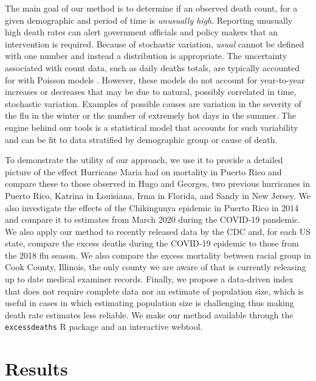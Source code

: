 \documentclass[11pt]{article}
\begin{document}
The main goal of our method is to determine if an observed death count, for a given demographic and period of time is \textit{unusually high}. Reporting unusually high death rates can alert government officials and policy makers that an intervention is required. Because of stochastic variation, \textit{usual} cannot be defined with one number and instead a distribution is appropriate. The uncertainty associated with count data, such as daily deaths totals, are typically accounted for with Poisson models \cite{mccullagh19831989, agresti2015foundations}. However, these models do not account for year-to-year increases or decreases that may be due to natural, possibly correlated in time, stochastic variation. Examples of possible causes are variation in the severity of the flu in the winter or the number of extremely hot days in the summer. The engine behind our tools is a statistical model that accounts for such variability and can be fit to data stratified by demographic group or cause of death. 

To demonstrate the utility of our approach, we use it to provide a detailed picture of the effect Hurricane Maria had on mortality in Puerto Rico and compare these to those observed in Hugo and Georges, two previous hurricanes in Puerto Rico, Katrina in Louisiana, Irma in Florida, and Sandy in New Jersey. We also investigate the effects of the Chikingunya epidemic in Puerto Rico in 2014 and compare it to estimates from March 2020 during the COVID-19 pandemic. We also apply our method to recently released data by the CDC and, for each US state, compare the excess deaths during the COVID-19 epidemic to those from the 2018 flu season. We also compare the excess mortality between racial group in Cook County, Illinois, the only county we are aware of that is currently releasing up to date medical examiner records. Finally, we propose a data-driven index that does not require complete data nor an estimate of population size, which is useful in cases in which estimating population size is challenging thus making death rate estimates less reliable. We make our method available through the \verb+excessdeaths+ R package and an interactive webtool. \\

\section{Results}
\label{sec:results}
\end{document}
